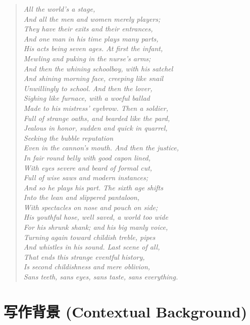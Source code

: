 \documentclass[12pt, a4paper]{article}
\begin{document}
\begin{quote}
\textit{All the world's a stage, \\
And all the men and women merely players; \\
They have their exits and their entrances, \\
And one man in his time plays many parts, \\
His acts being seven ages. At first the infant, \\
Mewling and puking in the nurse's arms; \\
And then the whining schoolboy, with his satchel \\
And shining morning face, creeping like snail \\
Unwillingly to school. And then the lover, \\
Sighing like furnace, with a woeful ballad \\
Made to his mistress' eyebrow. Then a soldier, \\
Full of strange oaths, and bearded like the pard, \\
Jealous in honor, sudden and quick in quarrel, \\
Seeking the bubble reputation \\
Even in the cannon's mouth. And then the justice, \\
In fair round belly with good capon lined, \\
With eyes severe and beard of formal cut, \\
Full of wise saws and modern instances; \\
And so he plays his part. The sixth age shifts \\
Into the lean and slippered pantaloon, \\
With spectacles on nose and pouch on side; \\
His youthful hose, well saved, a world too wide \\
For his shrunk shank; and his big manly voice, \\
Turning again toward childish treble, pipes \\
And whistles in his sound. Last scene of all, \\
That ends this strange eventful history, \\
Is second childishness and mere oblivion, \\
Sans teeth, sans eyes, sans taste, sans everything.}
\end{quote}

\section{写作背景 (Contextual Background)}
\end{document}
